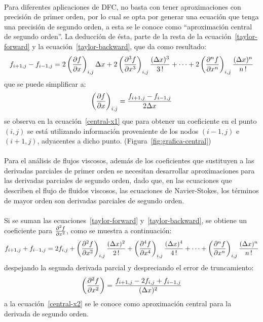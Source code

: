 \documentclass[letterpaper, openright, 12pt]{book}
\begin{document}
    \paragraph*{}
    Para diferentes aplicaciones de DFC, no basta con tener aproximaciones con
    precisión de primer orden, por lo cual se opta por generar una ecuación que
    tenga una precisión de segundo orden, a esta se le conoce como
    ``aproximación central de segundo orden''. La deducción de ésta, parte de la
    resta de la ecuación~\ref{taylor-forward} y la ecuación~\ref{taylor-backward},
    que da como resultado:
    \begin{equation}
    f_{i+1,j} - f_{i-1, j} = 2 \left( \pdv{f}{x} \right)_{i,j} \Delta x + 2 \left( \pdv[3]{f}{x} \right)_{i,j} \frac{(\Delta x)^3}{3 \,!} + \dotsb + 2 \left( \pdv[n]{f}{x} \right)_{i,j} \frac{(\Delta x)^n}{n\,!}
    \end{equation}
    que se puede simplificar a:\\
    \begin{equation}
    \left( \pdv{f}{x} \right)_{i,j} = \frac{f_{i+1,j} - f_{i-1,j}}{2 \Delta x}
    \label{central-x1}
    \end{equation}
    se observa en la ecuación~\ref{central-x1} que para obtener un coeficiente
    en el punto $(i,j)$ se está utilizando información proveniente de los nodos
    $(i-1, j)$ e $(i+1, j)$, adyacentes a dicho punto. (Figura~\ref{fig:grafica-central})

    \paragraph*{}
    Para el análisis de flujos viscosos, además de los coeficientes que sustituyen
    a las derivadas parciales de primer orden se necesitan desarrollar
    aproximaciones para las derivadas parciales de segundo orden, dado que, en
    las ecuaciones que describen el flujo de fluidos viscosos, las ecuaciones de
    Navier-Stokes, los términos de mayor orden son derivadas parciales de
    segundo orden.

    \paragraph*{}
    Si se suman las ecuaciones~\ref{taylor-forward} y~\ref{taylor-backward}, se
    obtiene un coeficiente para $\pdv[2]{f}{x}$, como se muestra a continuación:
    \begin{equation*}
    f_{i+1,j} + f_{i-1, j} = 2 f_{i,j} + \left( \pdv[2]{f}{x} \right)_{i,j} \frac{(\Delta x) ^2}{2\,!} + \left( \pdv[4]{f}{x} \right)_{i,j} \frac{(\Delta x)^4}{4\,!} + \dotsb + \left( \pdv[n]{f}{x} \right)_{i,j} \frac{(\Delta x)^n}{n\,!}
    \end{equation*}
    despejando la segunda derivada parcial y despreciando el error de truncamiento:
    \begin{equation}
    \left( \pdv[2]{f}{x} \right) = \frac{f_{i+1,j} - 2f_{i,j} + f_{i-1,j}}{(\Delta x)^2}
    \label{central-x2}
    \end{equation}
    a la ecuación~\ref{central-x2} se le conoce como aproximación central para
    la derivada de segundo orden.
\end{document}
